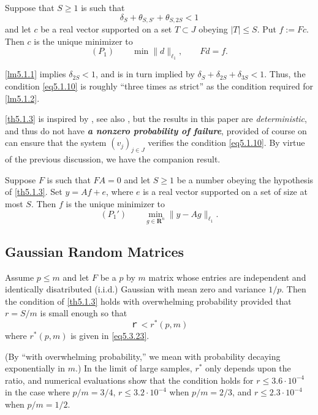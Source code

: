 \begin{theorem}
    Suppose that $S \geq 1$ is such that 
    \begin{equation}
        \delta_S+ \theta_{S,S'}+ \theta_{S,2S} <1
        \label{eq5.1.10}
    \end{equation}
    and let $c$ be a real vector supported on a set $T \subset J$ obeying $|T| \leq S$. Put $f:=Fc$. Then $c$ is the unique minimizer to 
    \begin{equation*}
        (P_1) \qquad \min\|d\|_{\ell_1}, \qquad Fd=f.
    \end{equation*}
    \label{th5.1.3}
\end{theorem}
\cref{lm5.1.1} implies $\delta_{2S}<1$, and is in turn implied by $\delta_S+\delta_{2S}+\delta_{3S}<1$. Thus, the condition \cref{eq5.1.10} is roughly ``three times as strict'' as the condition required for \cref{lm5.1.2}.

\cref{th5.1.3} is inspired by \cite{2-7}, see also \cite{Candes2006,Candes2006a}, but the results in this paper are \emph{\textcolor[rgb]{1,0,0}{deterministic}}, and thus do not have \emph{\textbf{\textcolor[rgb]{1,0,0}{a nonzero probability of failure}}}, provided of course on can ensure that the system $(v_j)_{j \in J}$ verifies the condition \cref{eq5.1.10}. By virtue of the previous discussion, we have the companion result.
\begin{theorem}
    Suppose $F$ is such that $FA=0$ and let $S \geq 1$ be a number obeying the hypothesis of \cref{th5.1.3}. Set $y=Af+e$, where $e$ is a real vector supported on a set of size at most $S$. Then $f$ is the unique minimizer to 
    \begin{equation*}
        (P_1') \qquad \min\limits_{g \in \mathbf{R}^n} \|y-Ag\|_{\ell_1}.
    \end{equation*}
    \label{th5.1.4}
\end{theorem}


\subsection{Gaussian Random Matrices}
\begin{theorem}
    Assume $p \leq m$ and let $F$ be a $p$ by $m$ matrix whose entries are independent and identically disatributed (i.i.d.) Gaussian with mean zero and variance $1/p$. Then the condition of \cref{th5.1.3} holds with overwhelming probability provided that $r=S/m$ is small enough so that
    \begin{equation*}
        ｒ< r^*(p,m)
    \end{equation*}
    where $r^*(p,m)$ is given in \cref{eq5.3.23}.
    \label{th5.1.5}
\end{theorem}
(By ``with overwhelming probability,'' we mean with probability decaying exponentially in $m$.) In the limit of large samples, $r^*$ only depends upon the ratio, and numerical evaluations show that the condition holds for $r \leq 3.6 \cdot 10^{-4}$ in the case where $p/m = 3/4$, $r \leq 3.2 \cdot 10^{-4}$ when $p/m = 2/3$, and $r \leq 2.3 \cdot 10^{-4}$ when $p/m = 1/2$.

